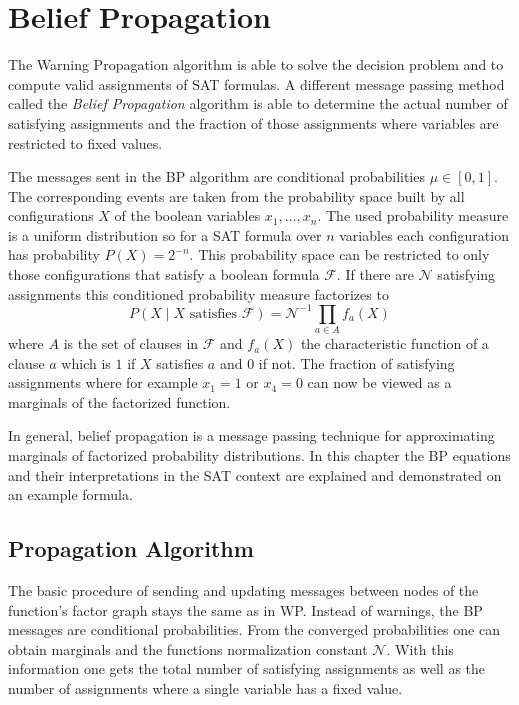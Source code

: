 \section{Belief Propagation} \label{BP}

The Warning Propagation algorithm is able to solve the decision problem and to compute valid assignments of SAT formulas. A different message passing method called the \emph{Belief Propagation} algorithm is able to determine the actual number of satisfying assignments and the fraction of those assignments where variables are restricted to fixed values. 

The messages sent in the BP algorithm are conditional probabilities $\mu \in [0, 1]$. The corresponding events are taken from the probability space built by all configurations $X$ of the  boolean variables $x_1, \ldots, x_n$. The used probability measure is a uniform distribution so for a SAT formula over $n$ variables each configuration has probability $P(X) = 2^{-n}$. \newline
This probability space can be restricted to only those configurations that satisfy a boolean formula $\mathcal{F}$. If there are $\mathcal{N}$ satisfying assignments this conditioned probability measure factorizes to $$P(X \; | \; X \text{ satisfies } \mathcal{F}) = \mathcal{N}^{-1} \prod_{a \in A} f_a(X)$$
where $A$ is the set of clauses in $\mathcal{F}$ and $f_a(X)$ the characteristic function of a clause $a$ which is $1$ if $X$ satisfies $a$ and $0$ if not. \newline
The fraction of satisfying assignments where for example $x_1 = 1$ or $x_4 = 0$ can now be viewed as a marginals of the factorized function. \newline

In general, belief propagation is a message passing technique for approximating marginals of factorized probability distributions. In this chapter the BP equations and their interpretations in the SAT context are explained and demonstrated on an example formula.

\subsection{Propagation Algorithm} \label{BPA}

The basic procedure of sending and updating messages between nodes of the function's factor graph stays the same as in WP. Instead of warnings, the BP messages are conditional probabilities. From the converged probabilities one can obtain marginals and the functions normalization constant $\mathcal{N}$. With this information one gets the total number of satisfying assignments as well as the number of assignments where a single variable has a fixed value.

